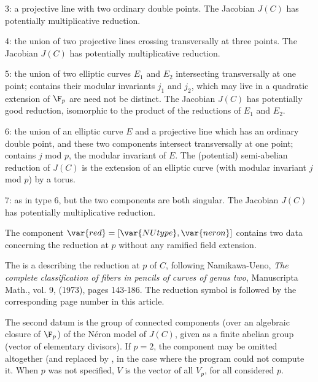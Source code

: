 \item 3: a projective line with two ordinary double points. The Jacobian
$J(C)$ has potentially multiplicative reduction.

\item 4: the union of two projective lines crossing transversally at three
points. The Jacobian $J(C)$ has potentially multiplicative reduction.

\item 5: the union of two elliptic curves $E_1$ and $E_2$ intersecting
transversally at one point;  contains their modular invariants
$j_1$ and $j_2$, which may live in a quadratic extension of $\F_p$ are need
not be distinct. The Jacobian $J(C)$ has potentially good reduction,
isomorphic to the product of the reductions of $E_1$ and $E_2$.

\item 6: the union of an elliptic curve $E$ and a projective line which has
an ordinary double point, and these two components intersect transversally
at one point;  contains $j$ mod $p$, the modular invariant of $E$.
The (potential) semi-abelian reduction of $J(C)$ is the extension of an
elliptic curve (with modular invariant $j$ mod $p$) by a torus.

\item 7: as in type 6, but the two components are both singular. The
Jacobian $J(C)$ has potentially multiplicative reduction.

The component $\var{red} = [\var{NUtype}, \var{neron}]$ contains two data
concerning the reduction at $p$ without any ramified field extension.

The  is a  describing the reduction at $p$ of $C$,
following Namikawa-Ueno, \emph{The complete classification of fibers in
pencils of curves of genus two}, Manuscripta Math., vol. 9, (1973), pages
143-186. The reduction symbol is followed by the corresponding page number in
this article.

The second datum  is the group of connected components (over an
algebraic closure of $\F_p$) of the N\'eron model of $J(C)$, given as a
finite abelian group (vector of elementary divisors).
\smallskip
If $p = 2$, the  component may be omitted altogether (and
replaced by \kbd{[]}, in the case where the program could not compute it.
When $p$ was not specified, $V$ is the vector of all $V_p$, for all
considered $p$.


